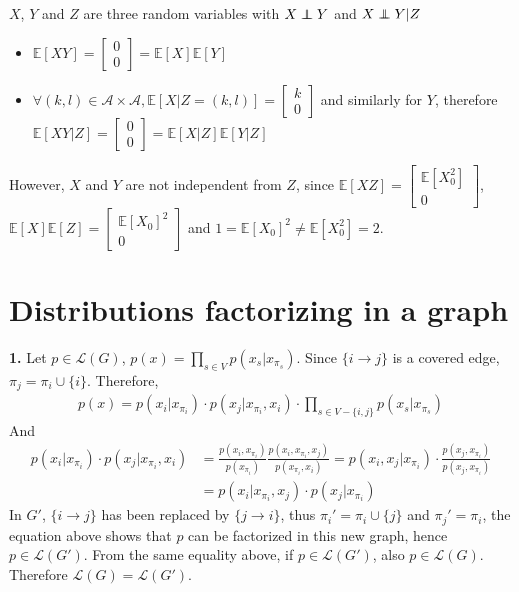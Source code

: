 \documentclass[11pt, oneside]{amsart}   	%
\newcommand\indep{\protect\mathpalette{\protect\indeP}{\perp}}
\def\indeP#1#2{\mathrel{\rlap{$#1#2$}\mkern2mu{#1#2}}}
\begin{document}
 $X$, $Y$ and $Z$ are three random variables with $X \indep Y$ and $ X \indep Y | Z$
 \begin{itemize}
\item  $\mathbb{E}[XY] =  \begin{bmatrix} 0 \\ 0 \end{bmatrix} = \mathbb{E}[X]\mathbb{E}[Y]$
\item $\forall (k,l) \in \mathcal{A}\times\mathcal{A},  \mathbb{E}[X|Z=(k,l)] =  \begin{bmatrix} k \\ 0 \end{bmatrix}$ and similarly for $Y$, therefore $\mathbb{E}[XY|Z] =  \begin{bmatrix} 0 \\ 0 \end{bmatrix} = \mathbb{E}[X|Z]\mathbb{E}[Y|Z]$
 \end{itemize}
 However, $X$ and $Y$ are not independent from $Z$, since  $\mathbb{E}[XZ] = \begin{bmatrix} \mathbb{E}[X_0^2] \\ 0 \end{bmatrix}$, $\mathbb{E}[X]\mathbb{E}[Z] = \begin{bmatrix} \mathbb{E}[X_0]^2 \\ 0 \end{bmatrix}$ and $1 = \boxed{\mathbb{E}[X_0]^2 \neq \mathbb{E}[X_0^2] }= 2$.
 \vfill
 
 \clearpage
 \section{Distributions factorizing in a graph}
  \vfill
 \textbf{1.} Let $p\in\mathcal{L}(G)$, $p(x) = \prod_{s\in V} p(x_s|x_{\pi_s})$. Since $\{i\rightarrow j\}$ is a covered edge,  $\pi_j = \pi_i \cup \{i\}$. Therefore,
 \begin{align*}
 p(x) = p(x_i|x_{\pi_i})\cdot p(x_j|x_{\pi_i}, x_i) \cdot\prod_{s\in V-\{ i, j \}} p(x_s|x_{\pi_s})
 \end{align*}
 And 
 \begin{align*}
 p(x_i|x_{\pi_i})\cdot p(x_j|x_{\pi_i}, x_i) &= \frac{p(x_i, x_{\pi_i})}{p(x_{\pi_i})} \frac{p(x_i, x_{\pi_i}, x_j)}{p(x_{\pi_i}, x_i)} =p(x_i,  x_j |x_{\pi_i})\cdot \frac{p(x_j, x_{\pi_i})}{p(x_j, x_{\pi_i})}\\
 & = p(x_i | x_{\pi_i}, x_j)\cdot p(x_j|x_{\pi_i})
 \end{align*}
 In $G'$, $\{i\rightarrow j\}$ has been replaced by $\{j\rightarrow i\}$, thus $\pi_i' = \pi_i \cup \{j\}$ and $\pi_j' = \pi_i $, the equation above shows that $p$ can be factorized in this new graph, hence $p\in \mathcal{L}(G')$. From the same equality above, if $p\in \mathcal{L}(G')$, also $p\in \mathcal{L}(G)$. Therefore $\boxed{ \mathcal{L}(G) =  \mathcal{L}(G')}$.
 \vfill
 
\end{document}
